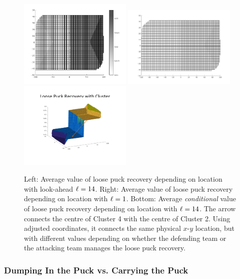 \begin{figure}
\centering 
\includegraphics[width=0.48\textwidth]{lpr2d.png}
\includegraphics[width=0.48\textwidth]{lpr2dL1}
\includegraphics[width=0.48\textwidth]{lpr-match}
\caption{Left: Average value of loose puck recovery depending on location with look-ahead $\ell=14$. Right: Average value of loose puck recovery depending on location with $\ell=1$. Bottom: Average {\em conditional} value of loose puck recovery depending on location with $\ell=14$. The arrow connects the centre of Cluster 4 with the centre of Cluster 2. Using adjusted coordinates, it connects the same physical $x$-$y$ location, but with different values depending on whether the defending team or the attacking team manages the loose puck recovery.}
\label{fig:lpr-values}
\end{figure}

\subsubsection{Dumping In the Puck vs. Carrying the Puck} 

